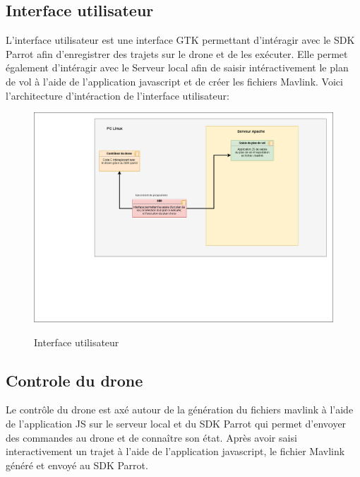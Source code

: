 \documentclass{article}
\begin{document}
    \subsection{Interface utilisateur}
    L'interface utilisateur est une interface GTK permettant d'intéragir avec le SDK Parrot afin d'enregistrer des trajets sur le drone et de les exécuter.
    \newline
    Elle permet également d'intéragir avec le Serveur local afin de saisir intéractivement le plan de vol à l'aide de l'application javascript et de créer les fichiers Mavlink.
    \vspace{0.2cm}
    \newline
    Voici l'architecture d'intéraction de l'interface utilisateur:
        \vspace*{0.5cm}
        \begin{center}
		\begin{figure}[!h]
		\includegraphics[scale=0.4]{01_archi_logicielle_IHM.png}\\
		 \vspace*{0.3cm}
		\caption{Interface utilisateur}
		\end{figure}
        \end{center}

\newpage
        
	 \subsection{Controle du drone}
	 Le contrôle du drone est axé autour de la génération du fichiers mavlink à l'aide de l'application JS sur le serveur local et du SDK Parrot qui permet d'envoyer des commandes au drone et de connaître son état.
	 \newline
	 Après avoir saisi interactivement un trajet à l'aide de l'application javascript, le fichier Mavlink généré et envoyé au SDK Parrot. 
	 \vspace{0.1cm}
	 \newline
	 
\end{document}
